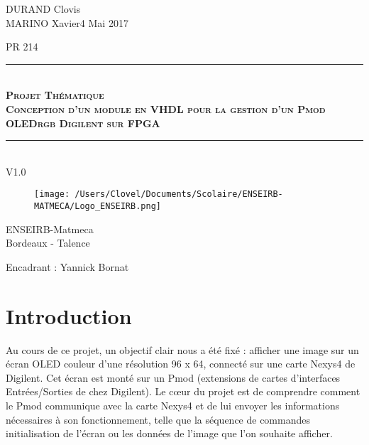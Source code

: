 \documentclass[11pt]{article}
\newcommand{\HRule}{\rule{\linewidth}{0.5mm}}
\begin{document}
\thispagestyle{empty}

\noindent 
DURAND Clovis \\ MARINO Xavier\hfill{4 Mai 2017}



\vspace{2cm}
\begin{center}
\Large{PR 214} %
\HRule \\[0.1cm]
{\textsc{\LARGE \textbf{Projet Thématique\\ Conception d'un module en VHDL pour la gestion d'un Pmod OLEDrgb Digilent sur FPGA}}}\\
\HRule\\[01cm]
\Large{V1.0} %
\end{center}
\vspace{1,5cm}

\begin{figure}[htbp]
\begin{center}
\texttt{[image: /Users/Clovel/Documents/Scolaire/ENSEIRB-MATMECA/Logo\_ENSEIRB.png]}
\end{center}
\end{figure}

\vspace{1cm}
\begin{center}
\Large{ENSEIRB-Matmeca \\ Bordeaux - Talence}
\end{center}

\vspace{1cm}
Encadrant : Yannick Bornat

\newpage
\tableofcontents
\listoffigures
\newpage 

\setcounter{section}{-1}

\section{Introduction}

Au cours de ce projet, un objectif clair nous a été fixé : afficher une image sur un écran OLED couleur d'une résolution 96 x 64, connecté sur une carte Nexys4 de Digilent. Cet écran est monté sur un Pmod (extensions de cartes d'interfaces Entrées/Sorties de chez Digilent). Le cœur du projet est de comprendre comment le Pmod communique avec la carte Nexys4 et de lui envoyer les informations nécessaires à son fonctionnement, telle que la séquence de commandes initialisation de l'écran ou les données de l'image que l'on souhaite afficher. \\
\end{document}
